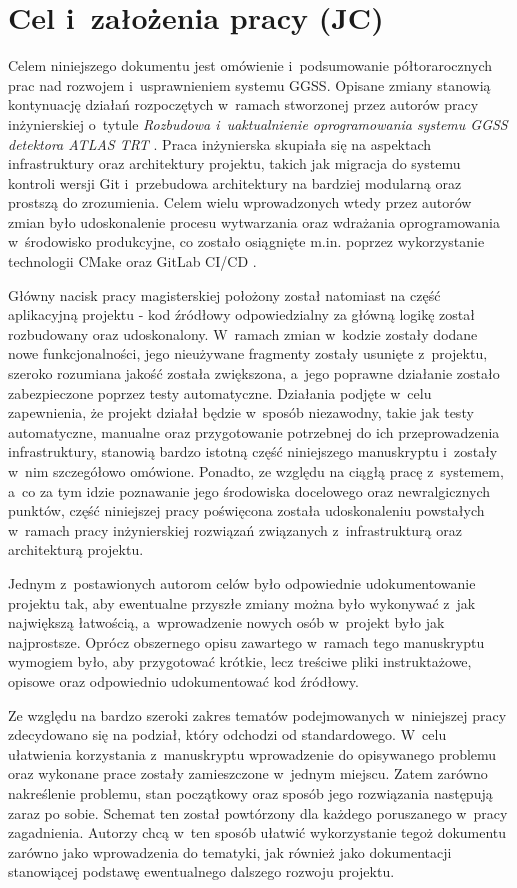 \section{Cel i~założenia pracy (JC)}
Celem niniejszego dokumentu jest omówienie i~podsumowanie półtorarocznych prac nad rozwojem i~usprawnieniem systemu GGSS. Opisane zmiany stanowią kontynuację działań rozpoczętych w~ramach stworzonej przez autorów pracy inżynierskiej o~tytule \emph{Rozbudowa i~uaktualnienie oprogramowania systemu GGSS detektora ATLAS TRT} \cite{GGSS_inz}. Praca inżynierska skupiała się na aspektach infrastruktury oraz architektury projektu, takich jak migracja do systemu kontroli wersji Git \cite{Git_main} i~przebudowa architektury na bardziej modularną oraz prostszą do zrozumienia. Celem wielu wprowadzonych wtedy przez autorów zmian było udoskonalenie procesu wytwarzania oraz wdrażania oprogramowania w~środowisko produkcyjne, co zostało osiągnięte m.in. poprzez wykorzystanie technologii CMake \cite{CMake_main} oraz GitLab CI/CD \cite{CI_main}. 

Główny nacisk pracy magisterskiej położony został natomiast na część aplikacyjną projektu - kod źródłowy odpowiedzialny za główną logikę został rozbudowany oraz udoskonalony. W~ramach zmian w~kodzie zostały dodane nowe funkcjonalności, jego nieużywane fragmenty zostały usunięte z~projektu, szeroko rozumiana jakość została zwiększona, a~jego poprawne działanie zostało zabezpieczone poprzez testy automatyczne. Działania podjęte w~celu zapewnienia, że projekt działał będzie w~sposób niezawodny, takie jak testy automatyczne, manualne oraz przygotowanie potrzebnej do ich przeprowadzenia infrastruktury, stanowią bardzo istotną część niniejszego manuskryptu i~zostały w~nim szczegółowo omówione. Ponadto, ze względu na ciągłą pracę z~systemem, a~co za tym idzie poznawanie jego środowiska docelowego oraz newralgicznych punktów, część niniejszej pracy poświęcona została udoskonaleniu powstałych w~ramach pracy inżynierskiej rozwiązań związanych z~infrastrukturą oraz architekturą projektu.

Jednym z~postawionych autorom celów było odpowiednie udokumentowanie projektu tak, aby ewentualne przyszłe zmiany można było wykonywać z~jak największą łatwością, a~wprowadzenie nowych osób w~projekt było jak najprostsze. Oprócz obszernego opisu zawartego w~ramach tego manuskryptu wymogiem było, aby przygotować krótkie, lecz treściwe pliki instruktażowe, opisowe oraz odpowiednio udokumentować kod źródłowy.

Ze względu na bardzo szeroki zakres tematów podejmowanych w~niniejszej pracy zdecydowano się na podział, który odchodzi od standardowego. W~celu ułatwienia korzystania z~manuskryptu wprowadzenie do opisywanego problemu oraz wykonane prace zostały zamieszczone w~jednym miejscu. Zatem zarówno nakreślenie problemu, stan początkowy oraz sposób jego rozwiązania następują zaraz po sobie. Schemat ten został powtórzony dla każdego poruszanego w~pracy zagadnienia. Autorzy chcą w~ten sposób ułatwić wykorzystanie tegoż dokumentu zarówno jako wprowadzenia do tematyki, jak również jako dokumentacji stanowiącej podstawę ewentualnego dalszego rozwoju projektu.
